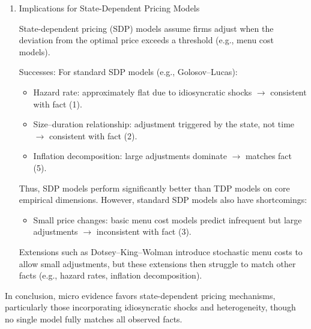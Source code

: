 \documentclass[12pt]{article}
\begin{document}
\begin{enumerate}
\begin{enumerate}
\begin{itemize}
            \item Small price changes: baseline model implies adjustments when sufficiently far from optimum $\rightarrow$ tends to generate large changes $\rightarrow$ inconsistent with fact (3).
            \item Inflation decomposition: inflation mainly driven by the fraction of adjusting firms $\rightarrow$ inconsistent with fact (5).
        \end{itemize}
        Thus, even though the Calvo model matches the hazard rate, it fails on several other key dimensions.
    \end{enumerate}
    \item Implications for State-Dependent Pricing Models

    State-dependent pricing (SDP) models assume firms adjust when the deviation from the optimal price exceeds a threshold (e.g., menu cost models).

    Successes: For standard SDP models (e.g., Golosov–Lucas):
    \begin{itemize}
        \item Hazard rate: approximately flat due to idiosyncratic shocks $\rightarrow$ consistent with fact (1).
        \item Size–duration relationship: adjustment triggered by the state, not time $\rightarrow$ consistent with fact (2).
        \item Inflation decomposition: large adjustments dominate $\rightarrow$ matches fact (5).
    \end{itemize}

    Thus, SDP models perform significantly better than TDP models on core empirical dimensions. However, standard SDP models also have shortcomings:
    \begin{itemize}
        \item Small price changes: basic menu cost models predict infrequent but large adjustments $\rightarrow$ inconsistent with fact (3).
    \end{itemize}
    Extensions such as Dotsey–King–Wolman introduce stochastic menu costs to allow small adjustments, but these extensions then struggle to match other facts (e.g., hazard rates, inflation decomposition).
\end{enumerate}

In conclusion, micro evidence favors state-dependent pricing mechanisms, particularly those incorporating idiosyncratic shocks and heterogeneity, though no single model fully matches all observed facts.
\end{document}
